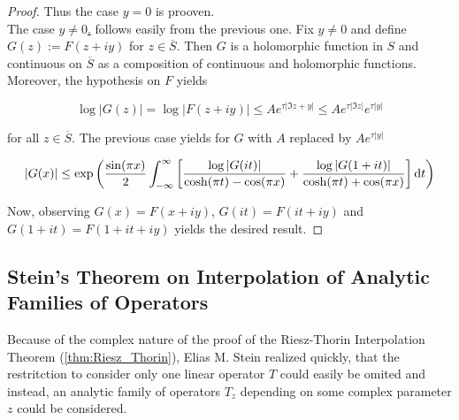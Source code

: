 \begin{proof}
Thus the case $y = 0$ is prooven.\\
The case \underline{$y \neq 0$.} follows easily from the previous one. Fix $y \neq 0$ and define $G(z) := F(z + iy)$ for $z \in \overline{S}$. Then $G$ is a holomorphic function in $S$ and continuous on $\overline{S}$ as a composition of continuous and holomorphic functions. Moreover, the hypothesis on $F$ yields

		\begin{equation}
			\log \vert G(z) \vert = \log \vert F(z + iy) \vert \leq Ae^{\tau \vert \Im z + y\vert} \leq Ae^{\tau \vert \Im z \vert}e^{\tau \vert y \vert}
		\end{equation}

		for all $z \in \overline{S}$. The previous case yields for $G$ with $A$ replaced by $Ae^{\tau\vert y \vert}$

		\begin{equation}
			\vert G(x) \vert \leq \exp\left( \frac{\sin(\pi x)}{2} \int_{-\infty}^\infty \left[ \frac{\log \vert G(it)\vert}{\cosh(\pi t) - \cos(\pi x)} + \frac{\log \vert G(1 + it)\vert}{\cosh(\pi t) + \cos(\pi x)} \right] \mathop{}\!\mathrm{d} t\right)
		\end{equation}

		Now, observing $G(x) = F(x + iy)$, $G(it) = F(it + iy)$ and $G(1 + it) = F(1 + it + iy)$ yields the desired result.
\end{proof}

\subsection{Stein's Theorem on Interpolation of Analytic Families of Operators}
Because of the complex nature of the proof of the Riesz-Thorin Interpolation Theorem (\ref{thm:Riesz_Thorin}), Elias M. Stein realized quickly, that the restritction to consider only one linear operator $T$ could easily be omited and instead, an analytic family of operators $T_z$ depending on some complex parameter $z$ could be considered.

\vspace{2mm}

